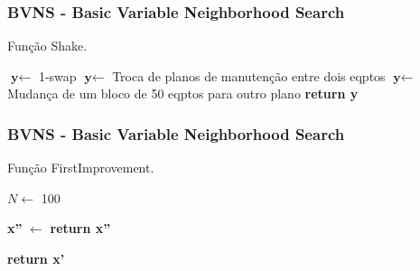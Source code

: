 \documentclass{beamer}
\begin{document}
    \begin{frame}
        \frametitle{BVNS - Basic Variable Neighborhood Search}
        \begin{algorithm}[H]
            \caption{Função Shake.}\label{alg:shake}
            \begin{algorithmic}[1]
                    \State $\textbf{y} \gets$ 1-swap
                \EndIf
                    \State $\textbf{y} \gets$ Troca de planos de manutenção entre dois eqptos
                \EndIf
                    \State $\textbf{y} \gets$ Mudança de um bloco de 50 eqptos para outro plano
                \EndIf
            \Statex
            \State \textbf{return y} 

            \EndProcedure 
            \end{algorithmic}
        \end{algorithm}
    \end{frame}

    \begin{frame}
        \frametitle{BVNS - Basic Variable Neighborhood Search}
        \begin{algorithm}[H]
            \caption{Função FirstImprovement.}\label{alg:first-improvement}

            \begin{algorithmic}[1]

            \State $N\gets$ 100 

                \State \textbf{x''} $\gets$  
                    \State \textbf{return x''} 
                \EndIf
            \EndFor
               
            \Statex
            \State \textbf{return x'} 
            \EndProcedure 
            \end{algorithmic}
        \end{algorithm}
    \end{frame}
\end{document}
